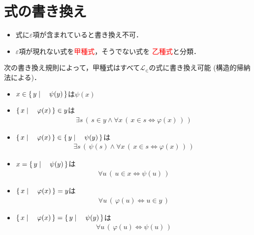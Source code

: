 \section{式の書き換え}
	\begin{itemize}
		\item 式に$\varepsilon$項が含まれていると書き換え不可．
		
		\item $\varepsilon$項が現れない式を\textcolor{red}{甲種式}，そうでない式を
			\textcolor{red}{乙種式}と分類．
	\end{itemize}
	
	次の書き換え規則によって，甲種式はすべて$\mathcal{L}_{\in}$の式に書き換え可能
	(構造的帰納法による)．
	
	\begin{itemize}
		\item $x \in \left\{\, y \mid \quad \psi(y)\, \right\}$は$\psi(x)$
		\item $\left\{\, x \mid \quad \varphi(x)\, \right\} \in y$は
			\begin{align}
				\exists s\, \left(\, s \in y \wedge 
				\forall x\, \left(\, x \in s \Longleftrightarrow \varphi(x)\, \right)\, \right)
			\end{align}
			
		\item $\left\{\, x \mid \quad \varphi(x)\, \right\} \in \left\{\, y \mid \quad \psi(y)\, \right\}$は
			\begin{align}
				\exists s\, \left(\, \psi(s) \wedge 
				\forall x\, \left(\, x \in s \Longleftrightarrow \varphi(x)\, \right)\, \right)
			\end{align}

\newpage
		\item $x = \left\{\, y \mid \quad \psi(y)\, \right\}$は
			\begin{align}
				\forall u\, \left(\, u \in x \Longleftrightarrow \psi(u)\, \right)
			\end{align}
		
		\item $\left\{\, x \mid \quad \varphi(x)\, \right\} = y$は
			\begin{align}
				\forall u\, \left(\, \varphi(u) \Longleftrightarrow u \in y\, \right)
			\end{align}
			
		\item $\left\{\, x \mid \quad \varphi(x)\, \right\} = \left\{\, y \mid \quad \psi(y)\, \right\}$は
			\begin{align}
				\forall u\, \left(\, \varphi(u) \Longleftrightarrow \psi(u)\, \right)
			\end{align}
	\end{itemize}